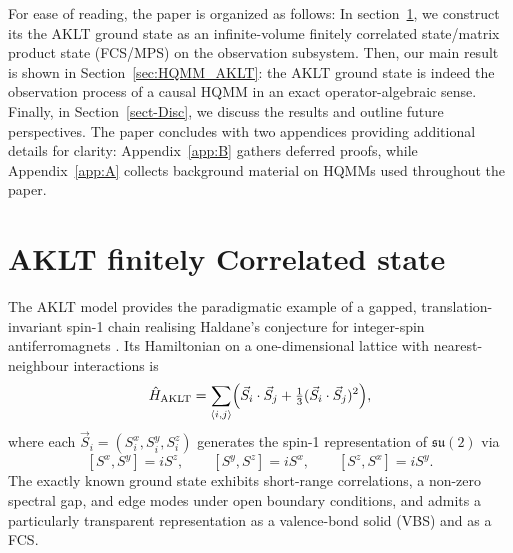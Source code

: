 \documentclass[11pt,a4paper]{article}
\begin{document}
For ease of reading, the paper is organized as follows: In section~\ref{sect_AKLTFCS}, we construct its the AKLT
ground state as an infinite-volume finitely correlated state/matrix product state (FCS/MPS) on the  observation subsystem. Then, our main result is shown in Section~\ref{sec:HQMM_AKLT}: the AKLT ground state is indeed the observation process of a causal HQMM in an exact operator-algebraic sense. Finally, in Section~\ref{sect-Disc}, we discuss the results and outline future perspectives. The paper concludes with two appendices providing additional details for clarity: Appendix~\ref{app:B} gathers deferred proofs, while Appendix~\ref{app:A} collects background material on HQMMs used throughout the paper. 
 
\section{AKLT finitely Correlated state}\label{sect_AKLTFCS}

The AKLT model provides the paradigmatic example of a gapped, translation-invariant spin-1 chain realising Haldane’s conjecture for integer-spin antiferromagnets \cite{Affleck1988,AKLT1987}. Its Hamiltonian on a one-dimensional lattice with nearest-neighbour interactions is
\[
\hat{H}_{\mathrm{AKLT}}
=
\sum_{\langle i,j\rangle}
\Bigl(
\vec{S}_i\cdot\vec{S}_j
+
\tfrac{1}{3}(\vec{S}_i\cdot\vec{S}_j)^2
\Bigr),
\]
where each $\vec{S}_i = (S_i^x,S_i^y,S_i^z)$ generates the spin-1 representation of $\mathfrak{su}(2)$ via
\[
[S^x,S^y] = i S^z,
\qquad
[S^y,S^z] = i S^x,
\qquad
[S^z,S^x] = i S^y.
\]
The exactly known ground state exhibits short-range correlations, a non-zero spectral gap, and edge modes under open boundary conditions, and admits a particularly transparent representation as a valence-bond solid (VBS) and as a FCS.
\end{document}
